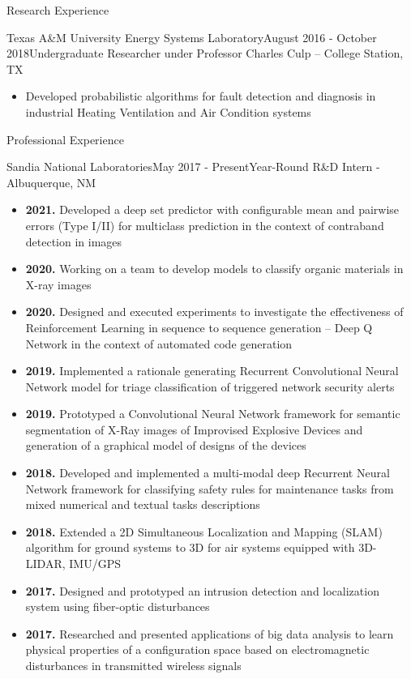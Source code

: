 \documentclass{resume} %
\begin{document}
\begin{rSection}{Research Experience}
\begin{rSubsection}{Texas A\&M University Energy Systems Laboratory}{August 2016 - October 2018}{Undergraduate Researcher under Professor Charles Culp -- College Station, TX}
\begin{itemize}
    \item Developed probabilistic algorithms for fault detection and diagnosis in industrial Heating Ventilation and Air Condition systems
\end{itemize}
\end{rSubsection}
\end{rSection}

\begin{rSection}{Professional Experience}
\begin{rSubsection}{Sandia National Laboratories}{May 2017 - Present}{Year-Round R\&D Intern - Albuquerque, NM}

\begin{itemize}
    \item \textbf{2021.} Developed a deep set predictor with configurable mean and pairwise errors (Type I/II) for multiclass prediction in the context of contraband detection in images
    \item \textbf{2020.} Working on a team to develop models to classify organic materials in X-ray images
    \item \textbf{2020.} Designed and executed experiments to investigate the effectiveness of Reinforcement Learning in sequence to sequence generation -- Deep Q Network in the context of automated code generation
    \item \textbf{2019.} Implemented a rationale generating Recurrent Convolutional Neural Network model for triage classification of triggered network security alerts
    \item \textbf{2019.} Prototyped a Convolutional Neural Network framework for semantic segmentation of X-Ray images of Improvised Explosive Devices and generation of a graphical model of designs of the devices
    \item \textbf{2018.} Developed and implemented a multi-modal deep Recurrent Neural Network framework for classifying safety rules for maintenance tasks from mixed numerical and textual tasks descriptions
    \item \textbf{2018.} Extended a 2D Simultaneous Localization and Mapping (SLAM) algorithm for ground systems to 3D for air systems equipped with 3D-LIDAR, IMU/GPS
    \item \textbf{2017.} Designed and prototyped an intrusion detection and localization system using fiber-optic disturbances 
    \item \textbf{2017.} Researched and presented applications of big data analysis to learn physical properties of a configuration space based on electromagnetic disturbances in transmitted wireless signals
\end{itemize}

\end{rSubsection}
\end{rSection}
\end{document}
